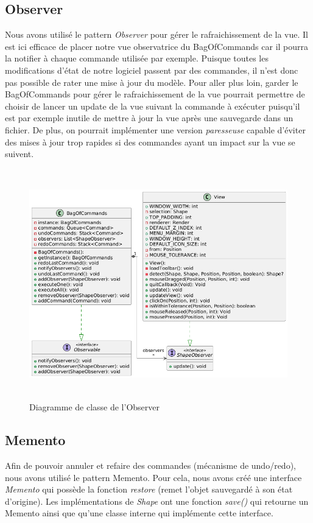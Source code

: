 \documentclass{article}
\begin{document}
\subsection{Observer}
Nous avons utilisé le pattern \textit{Observer} pour gérer le rafraichissement de la vue. Il est ici efficace de placer notre vue observatrice du BagOfCommands
car il pourra la notifier à chaque commande utilisée par exemple. Puisque toutes les modifications d'état de notre logiciel passent par des commandes, il n'est 
donc pas possible de rater une mise à jour du modèle. Pour aller plus loin, garder le BagOfCommands pour gérer le rafraichissement de la vue pourrait permettre 
de choisir de lancer un update de la vue suivant la commande à exécuter puisqu'il est par exemple inutile de mettre à jour la vue après une sauvegarde dans un fichier.
De plus, on pourrait implémenter une version \textit{paresseuse} capable d'éviter des mises à jour trop rapides si des commandes ayant un impact sur la vue se suivent.
\begin{figure}[h]
    \centering
    \includegraphics[width=\textwidth,height=10.0cm,keepaspectratio]{observer.png}
    \caption{Diagramme de classe de l'Observer}
    \label{Observer}
\end{figure}
\FloatBarrier

\subsection{Memento}
Afin de pouvoir annuler et refaire des commandes (mécanisme de undo/redo), nous avons utilisé le pattern Memento.
Pour cela, nous avons créé une interface \textit{Memento} qui possède la fonction \textit{restore} (remet l'objet sauvegardé à son état d'origine).
Les implémentations de \textit{Shape} ont une fonction \textit{save()} qui retourne un Memento ainsi que qu'une classe interne qui implémente cette interface.
\end{document}
